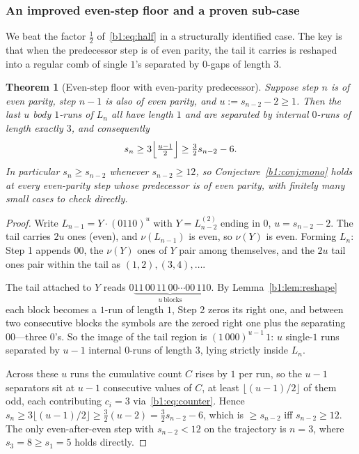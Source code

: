 \documentclass[a4paper]{article}
\theoremstyle{plain}
\newtheorem{thm}[theorem]{Theorem}
\theoremstyle{definition}
\theoremstyle{remark}
\begin{document}
\subsubsection{An improved even-step floor and a proven sub-case}\label{b1:sec:7.1}
We beat the factor $\tfrac12$ of~\eqref{b1:eq:half} in a structurally identified case. The key is that when the predecessor step is of even parity, the tail it carries is reshaped into a regular comb of single $1$'s separated by $0$-gaps of length $3$.

\begin{thm}[Even-step floor with even-parity predecessor]\label{b1:thm:floor}
Suppose step $n$ is of even parity, step $n-1$ is also of even parity, and $u:=s_{n-2}-2\ge 1$. Then the last $u$ body $1$-runs of $L_n$ all have length $1$ and are separated by internal $0$-runs of length exactly $3$, and consequently
\begin{equation}\label{b1:eq:floor}
s_n\ge 3\Bigl\lfloor\tfrac{u-1}{2}\Bigr\rfloor\ge\tfrac32 s_{n-2}-6.
\end{equation}
In particular $s_n\ge s_{n-2}$ whenever $s_{n-2}\ge 12$, so Conjecture~\ref{b1:conj:mono} holds at every even-parity step whose predecessor is of even parity, with finitely many small cases to check directly.
\end{thm}
\begin{proof}
Write $L_{n-1}=Y\cdot(0110)^u$ with $Y=L^{(2)}_{n-2}$ ending in $0$, $u=s_{n-2}-2$. The tail carries $2u$ ones (even), and $\nu(L_{n-1})$ is even, so $\nu(Y)$ is even. Forming $L_n$: Step 1 appends $00$, the $\nu(Y)$ ones of $Y$ pair among themselves, and the $2u$ tail ones pair within the tail as $(1,2),(3,4),\dots$.

The tail attached to $Y$ reads $0\underbrace{11\,00\,11\,00\cdots 00\,11}_{u\ \text{blocks}}0$. By Lemma~\ref{b1:lem:reshape} each block becomes a $1$-run of length $1$, Step 2 zeros its right one, and between two consecutive blocks the symbols are the zeroed right one plus the separating $00$---three $0$'s. So the image of the tail region is $(1\,000)^{u-1}\,1$: $u$ single-$1$ runs separated by $u-1$ internal $0$-runs of length $3$, lying strictly inside $L_n$.

Across these $u$ runs the cumulative count $C$ rises by $1$ per run, so the $u-1$ separators sit at $u-1$ consecutive values of $C$, at least $\lfloor(u-1)/2\rfloor$ of them odd, each contributing $c_i=3$ via~\eqref{b1:eq:counter}. Hence $s_n\ge 3\lfloor(u-1)/2\rfloor\ge\tfrac32(u-2)=\tfrac32 s_{n-2}-6$, which is $\ge s_{n-2}$ iff $s_{n-2}\ge 12$. The only even-after-even step with $s_{n-2}<12$ on the trajectory is $n=3$, where $s_3=8\ge s_1=5$ holds directly.
\end{proof}
\end{document}

